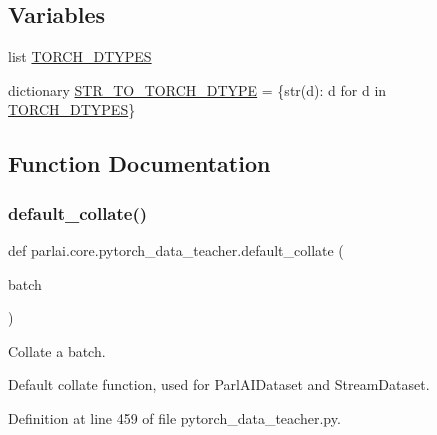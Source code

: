\subsection*{Variables}
\begin{DoxyCompactItemize}
\item 
list \hyperlink{namespaceparlai_1_1core_1_1pytorch__data__teacher_a70d3594b63522c1d2596bd15f1fb89e0}{T\+O\+R\+C\+H\+\_\+\+D\+T\+Y\+P\+ES}
\item 
dictionary \hyperlink{namespaceparlai_1_1core_1_1pytorch__data__teacher_a34008e5ea53ba69d5da10b59d55abef4}{S\+T\+R\+\_\+\+T\+O\+\_\+\+T\+O\+R\+C\+H\+\_\+\+D\+T\+Y\+PE} = \{str(d)\+: d for d in \hyperlink{namespaceparlai_1_1core_1_1pytorch__data__teacher_a70d3594b63522c1d2596bd15f1fb89e0}{T\+O\+R\+C\+H\+\_\+\+D\+T\+Y\+P\+ES}\}
\end{DoxyCompactItemize}


\subsection{Function Documentation}
\mbox{\label{namespaceparlai_1_1core_1_1pytorch__data__teacher_a7236aa20497f2a598df9b85909901184}} 
\subsubsection{\texorpdfstring{default\+\_\+collate()}{default\_collate()}}
{\footnotesize\ttfamily def parlai.\+core.\+pytorch\+\_\+data\+\_\+teacher.\+default\+\_\+collate (\begin{DoxyParamCaption}\item[{}]{batch }\end{DoxyParamCaption})}

\begin{DoxyVerb}Collate a batch.

Default collate function, used for ParlAIDataset and StreamDataset.
\end{DoxyVerb}
 

Definition at line 459 of file pytorch\+\_\+data\+\_\+teacher.\+py.


